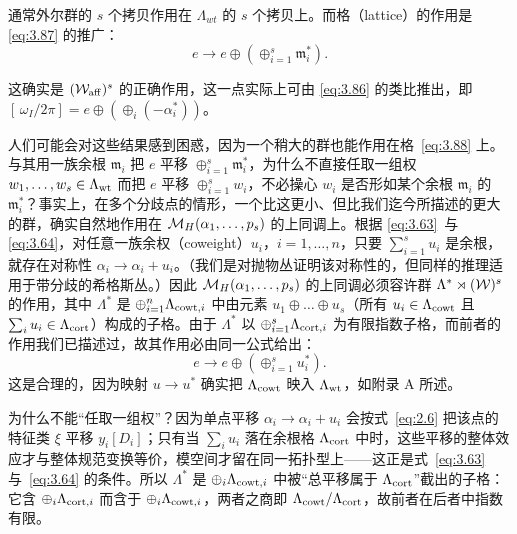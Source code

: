 通常外尔群的 $s$ 个拷贝作用在 $\Lambda_{wt}$ 的 $s$ 个拷贝上。而格（lattice）的作用是 \eqref{eq:3.87} 的推广：
\setcounter{equation}{88}
\begin{equation}\label{eq:3.89}
  e\to e\oplus\left(\oplus_{i=1}^s {\mathfrak{m}}_i^*\right).
\end{equation}

这确实是 $({\mathcal W}_{\rm aff})^s$ 的正确作用，这一点实际上可由 \eqref{eq:3.86} 的类比推出，即 $[\,\omega_I/2\pi]=e\oplus\left(\oplus_i(-\alpha^*_i)\right)$。

人们可能会对这些结果感到困惑，因为一个稍大的群也能作用在格~\eqref{eq:3.88} 上。与其用一族余根 $\mathfrak{m}_i$ 把 $e$ 平移 $\oplus_{i=1}^s {\mathfrak{m}}^*_i$，为什么不直接任取一组权 $w_1,\dots,w_s\in \Lambda_{\rm wt}$ 而把 $e$ 平移 $\oplus_{i=1}^s w_i$，不必操心 $w_i$ 是否形如某个余根 $\mathfrak{m}_i$ 的 ${\mathfrak{m}}^*_i$？事实上，在多个分歧点的情形，一个比这更小、但比我们迄今所描述的更大的群，确实自然地作用在 ${{\mathcal{M}}_H}( \alpha_1,\dots,p_s)$ 的上同调上。根据 \eqref{eq:3.63}\ 与 \eqref{eq:3.64}，对任意一族余权（coweight）$u_i$，$i=1,\dots,n$，只要 $\sum_{i=1}^su_i$ 是余根，就存在对称性 $\alpha_i\to \alpha_i+u_i$。（我们是对抛物丛证明该对称性的，但同样的推理适用于带分歧的希格斯丛。）因此 ${{\mathcal{M}}_H}(\alpha_1,\dots,p_s)$ 的上同调必须容许群 $\Lambda^*\rtimes ({\mathcal W})^s$ 的作用，其中 $\Lambda^*$ 是 $\oplus_{i=1}^n \Lambda_{{\rm cowt},i}$ 中由元素 $u_1\oplus\dots \oplus u_s$（所有 $u_i\in \Lambda_{\rm cowt}$ 且 $\sum_iu_i\in \Lambda_{\rm cort}$）构成的子格。由于 $\Lambda^*$ 以 $\oplus_{i=1}^s\Lambda_{{\rm cort},i}$ 为有限指数子格，而前者的作用我们已描述过，故其作用必由同一公式给出：
\setcounter{equation}{89}
\begin{equation}\label{eq:3.90}
  e\to
e\oplus\left(\oplus_{i=1}^s u^*_i\right).
\end{equation}
这是合理的，因为映射 $u\to u^*$ 确实把 $\Lambda_{\rm cowt}$ 映入 $\Lambda_{\rm wt}$，如附录 A 所述。

\begin{yizhu}[易错点]
为什么不能“任取一组权”？因为单点平移 $\alpha_i\to\alpha_i+u_i$ 会按式~\eqref{eq:2.6} 把该点的特征类 $\xi$ 平移 $y_i[D_i]$；只有当 $\sum_i u_i$ 落在余根格 $\Lambda_{\rm cort}$ 中时，这些平移的整体效应才与整体规范变换等价，模空间才留在同一拓扑型上——这正是式~\eqref{eq:3.63} 与~\eqref{eq:3.64} 的条件。所以 $\Lambda^*$ 是 $\oplus_i\Lambda_{{\rm cowt},i}$ 中被“总平移属于 $\Lambda_{\rm cort}$”截出的子格：它含 $\oplus_i\Lambda_{{\rm cort},i}$ 而含于 $\oplus_i\Lambda_{{\rm cowt},i}$，两者之商即 $\Lambda_{\rm cowt}/\Lambda_{\rm cort}$，故前者在后者中指数有限。
\end{yizhu}


